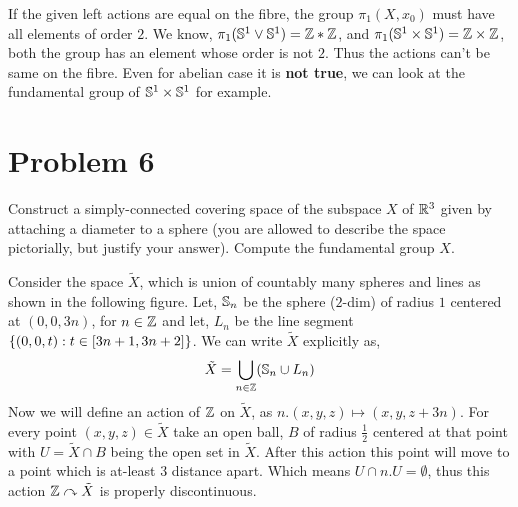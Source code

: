 \documentclass[11pt]{article}
\begin{document}
If the given left actions are equal on the fibre, the group $\pi_1(X,x_0)$ must have all elements of order $2$. We know, $\pi_1(\mathbb{S}^1\vee \mathbb{S}^1) = \mathbb{Z} \ast \mathbb{Z}$, and $\pi_1(\mathbb{S}^1 \times \mathbb{S}^1) = \mathbb{Z} \times \mathbb{Z}$, both the group has an element whose order is not $2$. Thus the actions can't be same on the fibre. Even for abelian case it is \textbf{\textsf{ not true}}, we can look at the fundamental group of $\mathbb{S}^1 \times \mathbb{S}^1$ for example. 

\pagebreak 

\section{Problem 6}
\begin{prob}{}{}
    Construct a simply-connected covering space of the subspace $X$ of $\mathbb{R}^3$ given by attaching a diameter to a sphere (you are allowed to describe the space pictorially, but justify your answer). Compute the fundamental group $X$.
\end{prob}
\sol Consider the space $\tilde{X}$, which is union of countably many spheres and lines as shown in the following figure. Let, $\mathbb{S}_n$ be the sphere ($2$-dim) of radius $1$ centered at $(0,0,3n)$, for $n \in \mathbb{Z}$ and let, $L_n$ be the line segment $\qty{(0,0,t) : t \in [3n+1,3n+2]}$. We can write $\tilde{X}$ explicitly as,  $$\tilde{X}= \bigcup_{n \in \mathbb{Z}} (\mathbb{S}_n\cup L_n)$$ 
Now we will define an action of $\mathbb{Z}$ on $\tilde{X}$, as $n.(x,y,z) \mapsto (x,y,z+3n)$. For every point $(x,y,z) \in \tilde{X}$ take an open ball, $B$ of radius $\frac{1}{2}$ centered at that point with $U = \tilde{X} \cap B$ being the open set in $\tilde{X}$. After this action this point will move to a point which is at-least $3$ distance apart. Which means $U \cap n.U =\emptyset$, thus this action $\mathbb{Z} \curvearrowright \tilde{X}$ is properly discontinuous. 
\end{document}
